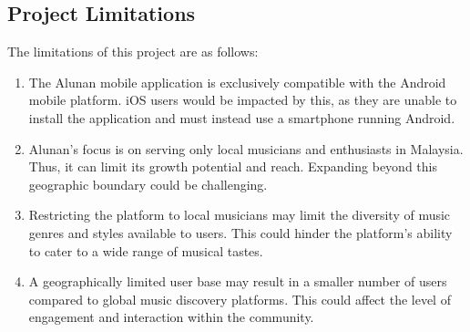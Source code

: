 \subsection{Project Limitations}
The limitations of this project are as follows:
\begin{enumerate}[1.]
    \item The Alunan mobile application is exclusively compatible with the Android mobile platform. iOS users would be impacted by this, as they are unable to install the application and must instead use a smartphone running Android. 
    \item Alunan's focus is on serving only local musicians and enthusiasts in Malaysia. Thus, it can limit its growth potential and reach. Expanding beyond this geographic boundary could be challenging.
    \item Restricting the platform to local musicians may limit the diversity of music genres and styles available to users. This could hinder the platform's ability to cater to a wide range of musical tastes.
    \item A geographically limited user base may result in a smaller number of users compared to global music discovery platforms. This could affect the level of engagement and interaction within the community.
\end{enumerate}
\pagebreak

